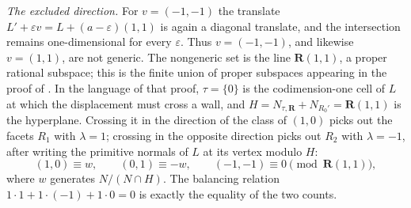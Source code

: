 \begin{example}
\emph{The excluded direction.}  For $v=(-1,-1)$ the translate
$L'+\varepsilon v=L+(a-\varepsilon)(1,1)$ is again a diagonal translate, and
the intersection remains one-dimensional for every $\varepsilon$.  Thus
$v=(-1,-1)$, and likewise $v=(1,1)$, are not generic.  The nongeneric set is
the line $\mathbf R(1,1)$, a proper rational subspace; this is the
finite union of proper subspaces appearing in the proof of
.  In the language of that proof,
$\tau=\{0\}$ is the codimension-one cell of $L$ at which the displacement
must cross a wall, and $H=N_{\tau,\mathbf R}+N_{R_0'}=\mathbf R(1,1)$ is the
hyperplane.  Crossing it in the direction of the class of $(1,0)$ picks out
the facets $R_1$ with $\lambda=1$; crossing in the opposite direction picks
out $R_2$ with $\lambda=-1$, after writing the primitive normals of $L$ at
its vertex modulo $H$:
\[
 (1,0)\equiv w,\qquad (0,1)\equiv-w,\qquad (-1,-1)\equiv0
 \pmod{\mathbf R(1,1)},
\]
where $w$ generates $N/(N\cap H)$.  The balancing relation
$1\cdot1+1\cdot(-1)+1\cdot0=0$ is exactly the equality of the two counts.
\end{example}

